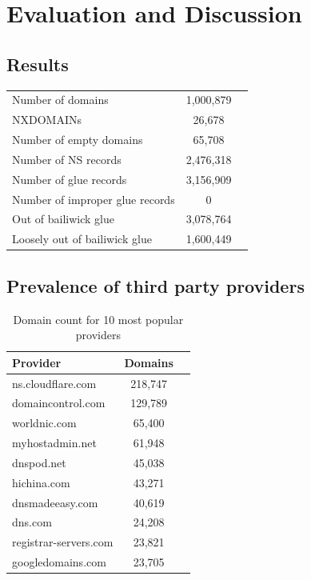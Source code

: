 \documentclass{idc_msc}
\begin{document}




\section{Evaluation and Discussion}

\subsection{Results}

\begin{table}[H]
\begin{tabular}{l|cc}
 & & \\
 \hline
 Number of domains & 1,000,879 & \\
 NXDOMAINs & 26,678 & \\
 Number of empty domains & 65,708 & \\
 Number of NS records & 2,476,318 & \\
 Number of glue records & 3,156,909 & \\
 Number of improper glue records & 0 & \\
 Out of bailiwick glue & 3,078,764 & \\
 Loosely out of bailiwick glue & 1,600,449 & \\
\end{tabular}
\end{table}

\subsection{Prevalence of third party providers}

\begin{table}[H]
\begin{tabular}{l|cc}
 Provider & Domains & \\
 \hline
 ns.cloudflare.com & 218,747 & \\
 domaincontrol.com & 129,789 & \\
 worldnic.com & 65,400 & \\
 myhostadmin.net & 61,948 & \\
 dnspod.net & 45,038 & \\
 hichina.com & 43,271 & \\
 dnsmadeeasy.com & 40,619 & \\
 dns.com & 24,208 & \\
 registrar-servers.com & 23,821 & \\
 googledomains.com & 23,705 & \\
\end{tabular}
\caption{Domain count for 10 most popular providers}
\end{table}
\end{document}
